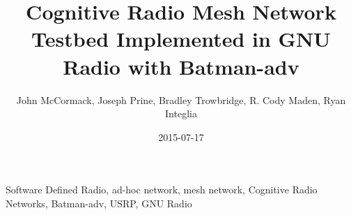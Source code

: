 \documentclass{IEEEtran}
\title{Cognitive Radio Mesh Network Testbed Implemented in GNU Radio with Batman-adv}
\date{2015-07-17}
\author{John McCormack, Joseph Prine, Bradley Trowbridge, R. Cody Maden, Ryan Integlia}
\begin{document}
\maketitle

\begin{abstract}
	
\end{abstract}
\begin{IEEEkeywords}
Software Defined Radio, ad-hoc network, mesh network, Cognitive Radio Networks, Batman-adv, USRP,
GNU Radio
\end{IEEEkeywords}











\end{document}
